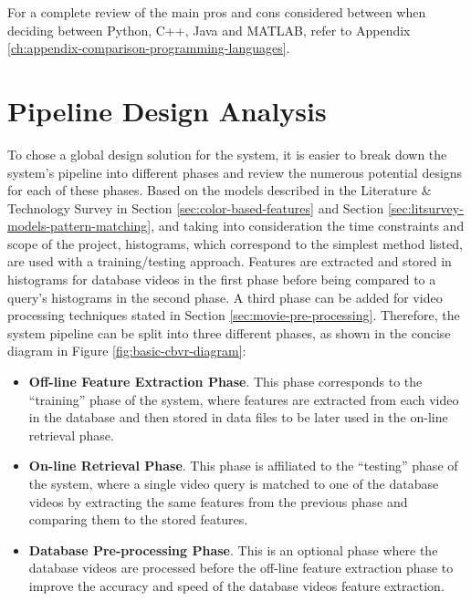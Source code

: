 For a complete review of the main pros and cons considered between when deciding between Python, C++, Java and MATLAB, refer to Appendix \ref{ch:appendix-comparison-programming-languages}.


\section{Pipeline Design Analysis}

To chose a global design solution for the system, it is easier to break down the system's pipeline into different phases and review the numerous potential designs for each of these phases. Based on the models described in the Literature \& Technology Survey in Section \ref{sec:color-based-features} and Section \ref{sec:litsurvey-models-pattern-matching}, and taking into consideration the time constraints and scope of the project, histograms, which correspond to the simplest method listed, are used with a training/testing approach. Features are extracted and stored in histograms for database videos in the first phase before being compared to a query's histograms in the second phase. A third phase can be added for video processing techniques stated in Section \ref{sec:movie-pre-processing}. Therefore, the system pipeline can be split into three different phases, as shown in the concise diagram in Figure \ref{fig:basic-cbvr-diagram}:

\begin{itemize}
    \item \textbf{Off-line Feature Extraction Phase}. This phase corresponds to the ``training'' phase of the system, where features are extracted from each video in the database and then stored in data files to be later used in the on-line retrieval phase.
    \item \textbf{On-line Retrieval Phase}. This phase is affiliated to the ``testing'' phase of the system, where a single video query is matched to one of the database videos by extracting the same features from the previous phase and comparing them to the stored features.
    \item \textbf{Database Pre-processing Phase}. This is an optional phase where the database videos are processed before the off-line feature extraction phase to improve the accuracy and speed of the database videos feature extraction.
\end{itemize}

